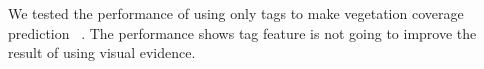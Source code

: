 \documentclass[10pt,journal,compsoc]{IEEEtran}
\begin{document}
We tested the performance of using only tags to make vegetation coverage prediction ~\cite{ecology2012www}. The performance shows tag
feature is not going to improve the result of using visual evidence.


%
\end{document}
